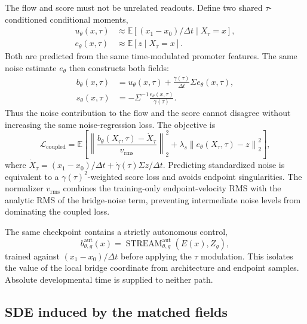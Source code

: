 \documentclass[11pt]{article}
\newcommand{\E}{\mathbb{E}}
\begin{document}
The flow and score must not be unrelated readouts. Define two shared
$\tau$-conditioned conditional moments,
\begin{align}
  u_\theta(x,\tau)
  &\approx \E[(x_1-x_0)/\Delta t\mid X_\tau=x], \\
  e_\theta(x,\tau)
  &\approx \E[z\mid X_\tau=x].
  \label{eq:conditional-moments}
\end{align}
Both are predicted from the same time-modulated promoter features. The same
noise estimate $e_\theta$ then constructs both fields:
\begin{align}
  b_\theta(x,\tau)
  &=u_\theta(x,\tau)
    +\frac{\dot\gamma(\tau)}{\Delta t}\Sigma e_\theta(x,\tau), \\
  s_\theta(x,\tau)
  &=-\Sigma^{-1}\frac{e_\theta(x,\tau)}{\gamma(\tau)}.
  \label{eq:coupled-fields}
\end{align}
Thus the noise contribution to the flow and the score cannot disagree without
increasing the same noise-regression loss. The objective is
\begin{equation}
  \mathcal L_{\mathrm{coupled}}
  =\E\left[
    \left\|\frac{b_\theta(X_\tau,\tau)-\dot X_\tau}{v_{\mathrm{rms}}}\right\|_2^2
    +\lambda_s\left\|e_\theta(X_\tau,\tau)-z\right\|_2^2
  \right],
  \label{eq:coupled-loss}
\end{equation}
where $\dot X_\tau=(x_1-x_0)/\Delta t+\dot\gamma(\tau)\Sigma
z/\Delta t$. Predicting standardized noise is equivalent to a
$\gamma(\tau)^2$-weighted score loss and avoids endpoint singularities.
The normalizer $v_{\mathrm{rms}}$ combines the training-only endpoint-velocity
RMS with the analytic RMS of the bridge-noise term, preventing intermediate
noise levels from dominating the coupled loss.

The same checkpoint contains a strictly autonomous control,
\begin{equation}
  b^{\mathrm{aut}}_{\theta,g}(x)
  =\operatorname{STREAM}^{\mathrm{aut}}_{\theta,g}(E(x),Z_g),
\end{equation}
trained against $(x_1-x_0)/\Delta t$ before applying the $\tau$ modulation.
This isolates the value of the local bridge coordinate from architecture and
endpoint samples. Absolute developmental time is supplied to neither path.

\subsection{SDE induced by the matched fields}
\end{document}
